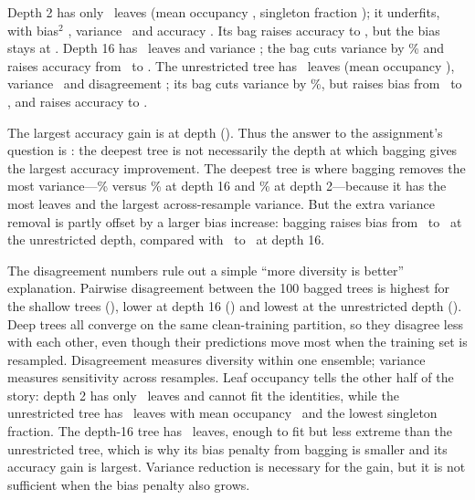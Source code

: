 \documentclass[10pt,twocolumn,letterpaper]{article}
\begin{document}
Depth 2 has only \DepthShallowLeaves~leaves (mean occupancy \DepthShallowMeanLeaf, singleton
fraction \DepthShallowSingleton); it underfits, with bias$^2$ \DepthShallowSingleBias,
variance \DepthShallowSingleVar~and accuracy \DepthShallowSingleAcc.  Its bag raises
accuracy to \DepthShallowBagAcc, but the bias stays at \DepthShallowBagBias.  Depth 16 has
\DepthMidLeaves~leaves and variance \DepthMidSingleVar; the bag cuts variance by
\DepthMidVarRed\% and raises accuracy from \DepthMidSingleAcc~to \DepthMidBagAcc.
The unrestricted tree has \DepthDeepLeaves~leaves (mean occupancy
\DepthDeepMeanLeaf), variance \DepthDeepSingleVar~and disagreement \DepthDeepDis; its bag
cuts variance by \DepthDeepVarRed\%, but raises bias from \DepthDeepSingleBias~to
\DepthDeepBagBias, and raises accuracy to \DepthDeepBagAcc.

The largest accuracy gain is at depth \LargestImprovementDepth
(\LargestImprovementGain).  Thus the answer to the assignment's question is
\textbf{\DeepestLargest}: the deepest tree is not necessarily the depth at which
bagging gives the largest accuracy improvement.  The deepest tree is where
bagging removes the most variance---\DepthDeepVarRed\% versus \DepthMidVarRed\% at
depth 16 and \DepthShallowVarRed\% at depth 2---because it has the most leaves and the
largest across-resample variance.  But the extra variance removal is partly
offset by a larger bias increase: bagging raises bias from \DepthDeepSingleBias~to
\DepthDeepBagBias~at the unrestricted depth, compared with \DepthMidSingleBias~to
\DepthMidBagBias~at depth 16.

The disagreement numbers rule out a simple ``more diversity is better''
explanation.  Pairwise disagreement between the 100 bagged trees is highest for
the shallow trees (\DepthShallowDis), lower at depth 16 (\DepthMidDis) and lowest at the
unrestricted depth (\DepthDeepDis).  Deep trees all converge on the same
clean-training partition, so they disagree less with each other, even though
their predictions move most when the training set is resampled.  Disagreement
measures diversity within one ensemble; variance measures sensitivity across
resamples.  Leaf occupancy tells the other half of the story: depth 2 has only
\DepthShallowLeaves~leaves and cannot fit the identities, while the unrestricted tree
has \DepthDeepLeaves~leaves with mean occupancy \DepthDeepMeanLeaf~and the lowest
singleton fraction.  The depth-16 tree has \DepthMidLeaves~leaves, enough to fit
but less extreme than the unrestricted tree, which is why its bias penalty from
bagging is smaller and its accuracy gain is largest.  Variance reduction is
necessary for the gain, but it is not sufficient when the bias penalty also
grows.
\end{document}
